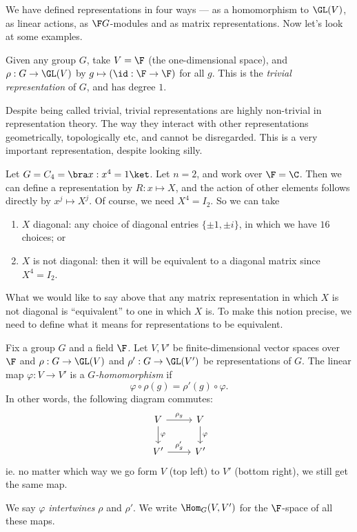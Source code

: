 \documentclass[a4paper]{article}
\begin{document}
We have defined representations in four ways --- as a homomorphism to $\GL(V)$, as linear actions, as $\F G$-modules and as matrix representations. Now let's look at some examples.

\begin{eg}
  Given any group $G$, take $V = \F$ (the one-dimensional space), and $\rho: G \to \GL(V)$ by $g \mapsto (\id: \F \to \F)$ for all $g$. This is the \emph{trivial representation} of $G$, and has degree $1$.
\end{eg}
Despite being called trivial, trivial representations are highly non-trivial in representation theory. The way they interact with other representations geometrically, topologically etc, and cannot be disregarded. This is a very important representation, despite looking silly.

\begin{eg}
  Let $G = C_4 = \bra x: x^4 = 1\ket$. Let $n = 2$, and work over $\F = \C$. Then we can define a representation by $R: x \mapsto X$, and the action of other elements follows directly by $x^j \mapsto X^j$. Of course, we need $X^4 = I_2$. So we can take
  \begin{enumerate}
    \item $X$ diagonal: any choice of diagonal entries $\{\pm 1, \pm i\}$, in which we have $16$ choices; or
    \item $X$ is not diagonal: then it will be equivalent to a diagonal matrix since $X^4 = I_2$.
  \end{enumerate}
\end{eg}
What we would like to say above that any matrix representation in which $X$ is not diagonal is ``equivalent'' to one in which $X$ is. To make this notion precise, we need to define what it means for representations to be equivalent.

\begin{defi}
  Fix a group $G$ and a field $\F$. Let $V, V'$ be finite-dimensional vector spaces over $\F$ and $\rho: G \to \GL(V)$ and $\rho': G \to \GL(V')$ be representations of $G$. The linear map $\varphi: V \to V'$ is a \emph{$G$-homomorphism} if
  \[
    \varphi \circ \rho(g) = \rho'(g) \circ \varphi.\tag{$*$}
  \]
  In other words, the following diagram commutes:
  \[
    \begin{tikzcd}
      V \ar[r, "\rho_g"] \ar[d, "\varphi"] & V \ar[d, "\varphi"]\\
      V' \ar[r, "\rho_g'"] & V'
    \end{tikzcd}
  \]
  ie. no matter which way we go form $V$ (top left) to $V'$ (bottom right), we still get the same map.

  We say $\varphi$ \emph{intertwines} $\rho$ and $\rho'$. We write $\Hom_G(V, V')$ for the $\F$-space of all these maps.
\end{defi}
\end{document}
